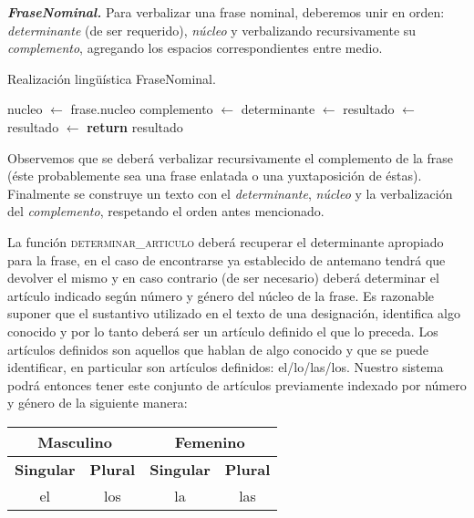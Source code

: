 \medskip
\noindent
\textbf{\emph{FraseNominal.}} Para verbalizar una frase nominal, deberemos unir en orden: \emph{determinante} (de ser requerido), \emph{núcleo} y verbalizando recursivamente su \emph{complemento}, agregando los espacios correspondientes entre medio.

\begin{algorithm}[H]
\caption{Realización lingüística FraseNominal.}
\begin{algorithmic}[1]
\State nucleo $\gets$ frase.nucleo
\State complemento $\gets$ 
\State determinante $\gets$ 
\State resultado $\gets$ 
\Else
\State resultado $\gets$ 
\EndIf
\Statex
\State \textbf{return} resultado
\EndFunction
\end{algorithmic}
\end{algorithm}

\noindent
Observemos que se deberá verbalizar recursivamente el complemento de la frase (éste probablemente sea una frase enlatada o una yuxtaposición de éstas). Finalmente se construye un texto con el \emph{determinante}, \emph{núcleo} y la verbalización del \emph{complemento}, respetando el orden antes mencionado.

La función \textsc{determinar\_articulo} deberá recuperar el determinante apropiado para la frase, en el caso de encontrarse ya establecido de antemano tendrá que devolver el mismo y en caso contrario (de ser necesario) deberá determinar el artículo indicado según número y género del núcleo de la frase. Es razonable suponer que el sustantivo utilizado en el texto de una designación, identifica algo conocido y por lo tanto deberá ser un artículo definido el que lo preceda. Los artículos definidos son aquellos que hablan de algo conocido y que se puede identificar, en particular son artículos definidos: el/lo/las/los. Nuestro sistema podrá entonces tener este conjunto de artículos previamente indexado por número y género de la siguiente manera:

\begin{table}[H]
\centering
\begin{tabular}{|c|c|c|c|}
\hline
\multicolumn{2}{|c|}{\textbf{Masculino}} & \multicolumn{2}{c|}{\textbf{Femenino}} \\ \hline
\textbf{Singular}    & \textbf{Plural}   & \textbf{Singular}   & \textbf{Plural}  \\ \hline
el                   & los               & la                  & las              \\ \hline
\end{tabular}
\end{table}

